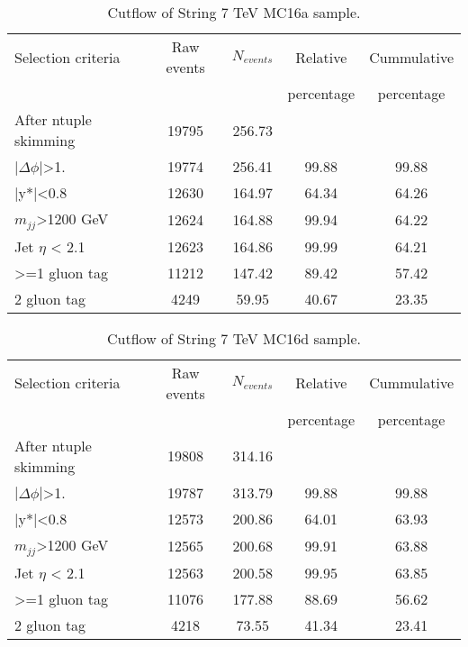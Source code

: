 \begin{table}[ht]
\begin{center}
\begin{tabular}{|l|c|c|c|c|}
\hline
Selection criteria & Raw events & $N_{events}$ & Relative & Cummulative \\
 & & & percentage & percentage \\
\hline
After ntuple skimming & 19795 & 256.73 &  &  \\
$|\Delta\phi|$>1. & 19774 & 256.41 & 99.88 & 99.88 \\
|y*|<0.8 & 12630 & 164.97 & 64.34 & 64.26 \\
$m_{jj}$>1200 GeV & 12624 & 164.88 & 99.94 & 64.22 \\
Jet $\eta$ < 2.1 & 12623 & 164.86 & 99.99 & 64.21 \\
>=1 gluon tag & 11212 & 147.42 & 89.42 & 57.42 \\
2 gluon tag & 4249 & 59.95 & 40.67 & 23.35 \\
\hline
\end{tabular}
\end{center}
\caption{Cutflow of String 7 TeV MC16a sample.}
\label{tab:String7MC16a}
\end{table}

\begin{table}[ht]
\begin{center}
\begin{tabular}{|l|c|c|c|c|}
\hline
Selection criteria & Raw events & $N_{events}$ & Relative & Cummulative \\
 & & & percentage & percentage \\
\hline
After ntuple skimming & 19808 & 314.16 &  &  \\
$|\Delta\phi|$>1. & 19787 & 313.79 & 99.88 & 99.88 \\
|y*|<0.8 & 12573 & 200.86 & 64.01 & 63.93 \\
$m_{jj}$>1200 GeV & 12565 & 200.68 & 99.91 & 63.88 \\
Jet $\eta$ < 2.1 & 12563 & 200.58 & 99.95 & 63.85 \\
>=1 gluon tag & 11076 & 177.88 & 88.69 & 56.62 \\
2 gluon tag & 4218 & 73.55 & 41.34 & 23.41 \\
\hline
\end{tabular}
\end{center}
\caption{Cutflow of String 7 TeV MC16d sample.}
\end{table}

